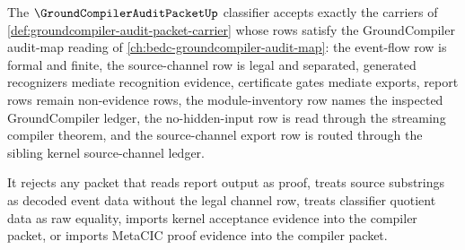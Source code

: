 \begin{definition}
\label{def:groundcompiler-audit-packet-classifier}
The $\GroundCompilerAuditPacketUp$ classifier accepts exactly the carriers of \autoref{def:groundcompiler-audit-packet-carrier} whose rows satisfy the GroundCompiler audit-map reading of \autoref{ch:bedc-groundcompiler-audit-map}: the event-flow row is formal and finite, the source-channel row is legal and separated, generated recognizers mediate recognition evidence, certificate gates mediate exports, report rows remain non-evidence rows, the module-inventory row names the inspected GroundCompiler ledger, the no-hidden-input row is read through the streaming compiler theorem, and the source-channel export row is routed through the sibling kernel source-channel ledger.

It rejects any packet that reads report output as proof, treats source substrings as decoded event data without the legal channel row, treats classifier quotient data as raw equality, imports kernel acceptance evidence into the compiler packet, or imports MetaCIC proof evidence into the compiler packet.
\end{definition}

